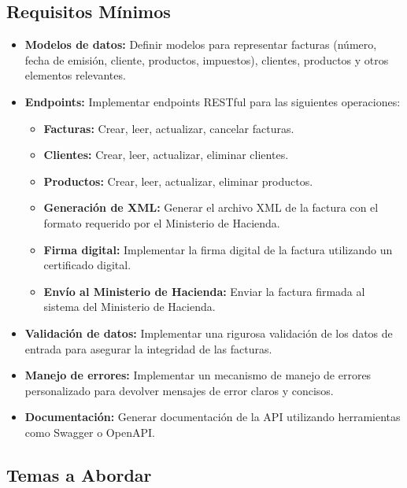 \documentclass[
]{agujournal2019}
\providecommand{\tightlist}{%
  \setlength{\itemsep}{0pt}\setlength{\parskip}{0pt}}\usepackage{longtable,booktabs,array}
\begin{document}
\subsection{Requisitos Mínimos}\label{requisitos-muxednimos-1}

\begin{itemize}
\item
  \textbf{Modelos de datos:} Definir modelos para representar facturas
  (número, fecha de emisión, cliente, productos, impuestos), clientes,
  productos y otros elementos relevantes.
\item
  \textbf{Endpoints:} Implementar endpoints RESTful para las siguientes
  operaciones:

  \begin{itemize}
  \tightlist
  \item
    \textbf{Facturas:} Crear, leer, actualizar, cancelar facturas.
  \item
    \textbf{Clientes:} Crear, leer, actualizar, eliminar clientes.
  \item
    \textbf{Productos:} Crear, leer, actualizar, eliminar productos.
  \item
    \textbf{Generación de XML:} Generar el archivo XML de la factura con
    el formato requerido por el Ministerio de Hacienda.
  \item
    \textbf{Firma digital:} Implementar la firma digital de la factura
    utilizando un certificado digital.
  \item
    \textbf{Envío al Ministerio de Hacienda:} Enviar la factura firmada
    al sistema del Ministerio de Hacienda.
  \end{itemize}
\item
  \textbf{Validación de datos:} Implementar una rigurosa validación de
  los datos de entrada para asegurar la integridad de las facturas.
\item
  \textbf{Manejo de errores:} Implementar un mecanismo de manejo de
  errores personalizado para devolver mensajes de error claros y
  concisos.
\item
  \textbf{Documentación:} Generar documentación de la API utilizando
  herramientas como Swagger o OpenAPI.
\end{itemize}

\subsection{Temas a Abordar}\label{temas-a-abordar-1}
\end{document}
